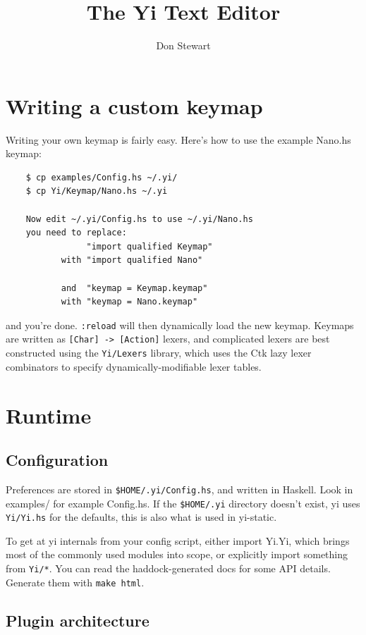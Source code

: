 \documentclass[]{article}
\title{The Yi Text Editor}
\author{Don Stewart}
\newcommand{\code}[1]{\texttt{#1}}
\begin{document}
\maketitle

\section{Writing a custom keymap}

Writing your own keymap is fairly easy. Here's how to use the example
Nano.hs keymap:
\begin{verbatim}
    $ cp examples/Config.hs ~/.yi/
    $ cp Yi/Keymap/Nano.hs ~/.yi

    Now edit ~/.yi/Config.hs to use ~/.yi/Nano.hs
    you need to replace:
                "import qualified Keymap"
           with "import qualified Nano"

           and  "keymap = Keymap.keymap"
           with "keymap = Nano.keymap"
\end{verbatim}

and you're done. \texttt{:reload} will then dynamically load the new
keymap. Keymaps are written as \code{[Char] -> [Action]} lexers, and
complicated lexers are best constructed using the \code{Yi/Lexers}
library, which uses the Ctk lazy lexer combinators to specify
dynamically-modifiable lexer tables.

\section{Runtime}

\subsection{Configuration}

Preferences are stored in \code{\$HOME/.yi/Config.hs}, and written in
Haskell. Look in examples/ for example Config.hs. If the
\code{\$HOME/.yi} directory doesn't exist, yi uses \code{Yi/Yi.hs} for
the defaults, this is also what is used in yi-static.

To get at yi internals from your config script, either import Yi.Yi,
which brings most of the commonly used modules into scope, or explicitly
import something from \code{Yi/*}. You can read the haddock-generated
docs for some API details. Generate them with \code{make html}.

\subsection{Plugin architecture}
\end{document}
